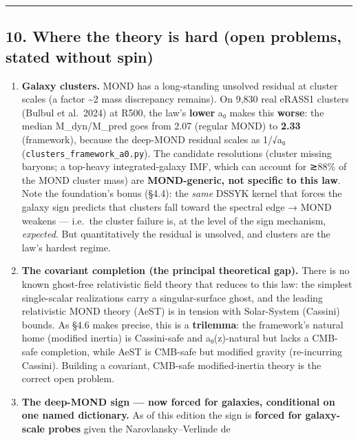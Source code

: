 \documentclass[
]{article}
\providecommand{\tightlist}{%
  \setlength{\itemsep}{0pt}\setlength{\parskip}{0pt}}
\begin{document}
\begin{center}\rule{0.5\linewidth}{0.5pt}\end{center}

\subsection{10. Where the theory is hard (open problems, stated without
spin)}\label{where-the-theory-is-hard-open-problems-stated-without-spin}

\begin{enumerate}
\def\labelenumi{\arabic{enumi}.}
\tightlist
\item
  \textbf{Galaxy clusters.} MOND has a long-standing unsolved residual
  at cluster scales (a factor \textasciitilde2 mass discrepancy
  remains). On 9,830 real eRASS1 clusters (Bulbul et al.~2024) at R500,
  the law's \textbf{lower} a₀ makes this \textbf{worse}: the median
  M\_dyn/M\_pred goes from 2.07 (regular MOND) to \textbf{2.33}
  (framework), because the deep-MOND residual scales as 1/√a₀
  (\texttt{clusters\_framework\_a0.py}). The candidate resolutions
  (cluster missing baryons; a top-heavy integrated-galaxy IMF, which can
  account for ≳88\% of the MOND cluster mass) are \textbf{MOND-generic,
  not specific to this law}. Note the foundation's bonus (§4.4): the
  \emph{same} DSSYK kernel that forces the galaxy sign predicts that
  clusters fall toward the spectral edge → MOND weakens --- i.e.~the
  cluster failure is, at the level of the sign mechanism,
  \emph{expected}. But quantitatively the residual is unsolved, and
  clusters are the law's hardest regime.
\item
  \textbf{The covariant completion (the principal theoretical gap).}
  There is no known ghost-free relativistic field theory that reduces to
  this law: the simplest single-scalar realizations carry a
  singular-surface ghost, and the leading relativistic MOND theory
  (AeST) is in tension with Solar-System (Cassini) bounds. As §4.6 makes
  precise, this is a \textbf{trilemma}: the framework's natural home
  (modified inertia) is Cassini-safe and a₀(z)-natural but lacks a
  CMB-safe completion, while AeST is CMB-safe but modified gravity
  (re-incurring Cassini). Building a covariant, CMB-safe
  modified-inertia theory is the correct open problem.
\item
  \textbf{The deep-MOND sign --- now forced for galaxies, conditional on
  one named dictionary.} As of this edition the sign is \textbf{forced
  for galaxy-scale probes} given the Narovlansky--Verlinde de

\end{enumerate}
\end{document}
